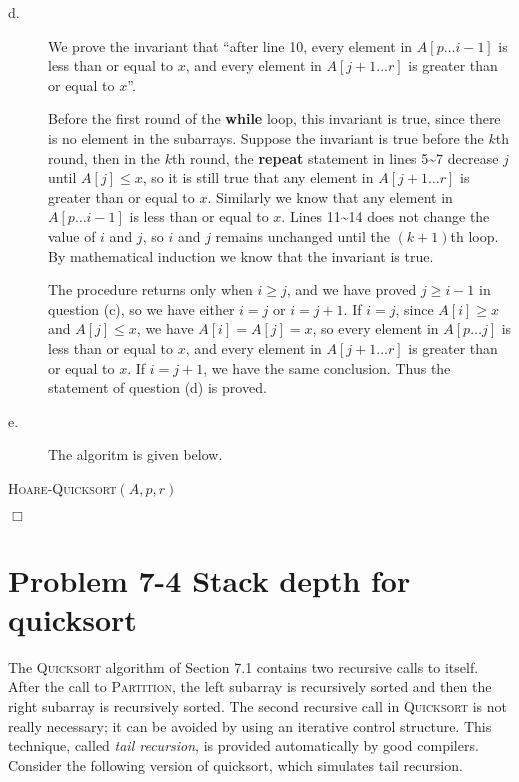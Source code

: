 \documentclass[a4paper,10pt]{article}
\newcommand{\problem}[1]{\section*{Problem #1}}
\newcommand{\qed}{\hfill \ensuremath{\Box}}
\begin{document}
\begin{description}
\item[d. \hspace{9pt}] We prove the invariant that ``after line 10, every element in $A[p \ldots i - 1]$
is less than or equal to $x$, and every element in $A[j + 1 \ldots r]$ is greater than
or equal to $x$''.

Before the first round of the \textbf{while} loop, this invariant is true, since there is no element in the
subarrays. Suppose the invariant is true before the $k$th round, then in the $k$th
round, the \textbf{repeat} statement in lines 5\textasciitilde 7 decrease $j$ until $A[j] \leq x$, so it is still
true that any element in $A[j + 1 \ldots r]$ is greater than or equal to $x$.
Similarly we know that any element in $A[p \ldots i - 1]$ is less than or equal to $x$. Lines 11\textasciitilde 14
 does not change the value of $i$ and $j$, so $i$ and $j$ remains unchanged until
the $(k + 1)$th loop. By mathematical induction we know that the invariant is true.

The procedure returns only when $i \geq j$, and we have proved $j \geq i - 1$ in question (c), so we
have either $i = j$ or $i = j + 1$. If $i = j$, since $A[i] \geq x$ and $A[j] \leq x$, 
we have $A[i] = A[j] = x$, so every element in $A[p \ldots j]$ is less than or equal to $x$,
and every element in $A[j + 1 \ldots r]$ is greater than or equal to $x$. If $i = j + 1$,
we have the same conclusion. Thus the statement of question (d) is proved.

\item[e. \hspace{9pt}] The algoritm is given below.

\end{description}
\begin{algorithm}[H]
\caption{\textsc{Hoare-Quicksort}$(A, p, r)$}
\end{algorithm}
\qed


\problem{7-4 Stack depth for quicksort}
The \textsc{Quicksort} algorithm of Section 7.1 contains two recursive calls to itself.
After the call to \textsc{Partition}, the left subarray is recursively sorted and then the right subarray
is recursively sorted. The second recursive call in \textsc{Quicksort} is not really necessary; it can be
avoided by using an iterative control structure. This technique, called \emph{tail recursion},
is provided automatically by good compilers. Consider the following version of quicksort, which simulates tail recursion.
\end{document}
